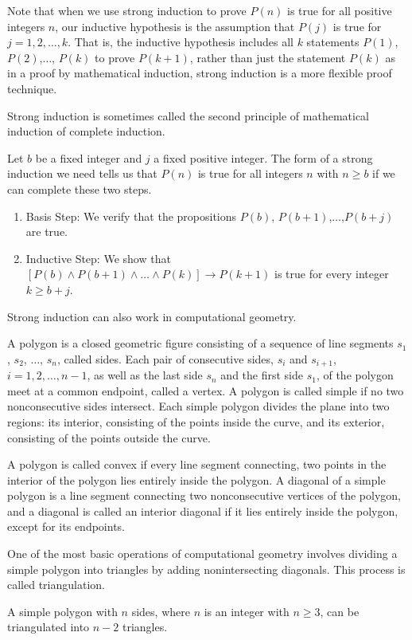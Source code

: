 \documentclass[../discrete.tex]{subfiles}
\begin{document}
Note that when we use strong induction to prove $P(n)$ is true for all positive integers $n$, 
our inductive hypothesis is the assumption that $P(j)$ is true for $j=1,2,\dots,k$. That is, the inductive hypothesis includes all $k$ 
statements $P(1)$, $P(2)$,$\dots$, $P(k)$ to prove $P(k+1)$, rather than just the statement $P(k)$ as in a proof by mathematical 
induction, strong induction is a more flexible proof technique.

Strong induction is sometimes called the second principle of mathematical induction of complete induction. 

Let $b$ be a fixed integer and $j$ a fixed positive integer. The form of a strong induction we need tells us that 
$P(n)$ is true for all integers $n$ with $n\geq b$ if we can complete these two steps.
\begin{enumerate}
    \item Basis Step: We verify that the propositions $P(b)$, $P(b+1)$,$\dots$,$P(b+j)$ are true.
    \item Inductive Step: We show that $[P(b)\land P(b+1)\land \dots \land P(k)]\rightarrow P(k+1)$ is true for every integer $k\geq b+j$.
\end{enumerate}

Strong induction can also work in computational geometry.

A polygon is a closed geometric figure consisting of a sequence of line segments 
$s_1$, $s_2$, $\dots$, $s_n$, called sides. Each pair of consecutive sides, $s_i$ and $s_{i+1}$, $i=1,2,\dots,n-1$, as well as the 
last side $s_n$ and the first side $s_1$, of the polygon meet at a common endpoint, called a vertex.
A polygon is called simple if no two nonconsecutive sides intersect. Each simple polygon divides the plane into two 
regions: its interior, consisting of the points inside the curve, and its exterior, consisting of the points outside 
the curve. 

A polygon is called convex if every line segment connecting, two points in the interior of the polygon 
lies entirely inside the polygon. A diagonal of a simple polygon is a line segment connecting 
two nonconsecutive vertices of the polygon, and a diagonal is called an interior diagonal if it lies entirely 
inside the polygon, except for its endpoints.

One of the most basic operations of computational geometry involves dividing a simple polygon into triangles by adding 
nonintersecting diagonals. This process is called triangulation.
\begin{theorem}
    A simple polygon with $n$ sides, where $n$ is an integer with $n\geq 3$, can be triangulated into $n-2$ triangles.
\end{theorem}
\end{document}
